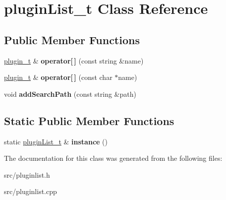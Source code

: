 \hypertarget{classpluginList__t}{\section{plugin\-List\-\_\-t \-Class \-Reference}
\label{classpluginList__t}
}
\subsection*{\-Public \-Member \-Functions}
\begin{DoxyCompactItemize}
\item 
\hypertarget{classpluginList__t_aa58f4dd72db474c32d0ca4423436048f}{\hyperlink{classplugin__t}{plugin\-\_\-t} \& {\bfseries operator\mbox{[}$\,$\mbox{]}} (const string \&name)}\label{classpluginList__t_aa58f4dd72db474c32d0ca4423436048f}

\item 
\hypertarget{classpluginList__t_a1c3c537421ad02479d3adca1ec62f806}{\hyperlink{classplugin__t}{plugin\-\_\-t} \& {\bfseries operator\mbox{[}$\,$\mbox{]}} (const char $\ast$name)}\label{classpluginList__t_a1c3c537421ad02479d3adca1ec62f806}

\item 
\hypertarget{classpluginList__t_ae3d9781fdddccfe57f79cc434c7267b3}{void {\bfseries add\-Search\-Path} (const string \&path)}\label{classpluginList__t_ae3d9781fdddccfe57f79cc434c7267b3}

\end{DoxyCompactItemize}
\subsection*{\-Static \-Public \-Member \-Functions}
\begin{DoxyCompactItemize}
\item 
\hypertarget{classpluginList__t_a919caa9b940e8c38e90664c623d5c432}{static \hyperlink{classpluginList__t}{plugin\-List\-\_\-t} \& {\bfseries instance} ()}\label{classpluginList__t_a919caa9b940e8c38e90664c623d5c432}

\end{DoxyCompactItemize}


\-The documentation for this class was generated from the following files\-:\begin{DoxyCompactItemize}
\item 
src/pluginlist.\-h\item 
src/pluginlist.\-cpp\end{DoxyCompactItemize}
